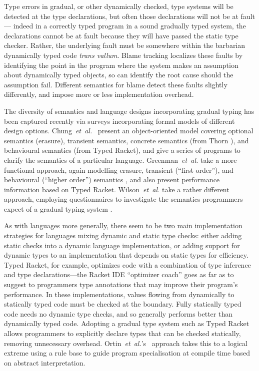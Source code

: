 
Type errors in gradual, or other dynamically checked, type systems will
be detected at the type declarations, but often those
declarations will not be at fault --- indeed in a correctly typed
program in a sound gradually typed system,  the declarations cannot be
at fault because they will have passed the static type
checker. Rather, the underlying fault must be somewhere within the
barbarian dynamically typed code \emph{trans vallum}.
Blame tracking\citep{blame2009,blameThreesomes2010,blameForAll2011} localizes these
faults by identifying 
the point in the program where the system makes an 
assumption about dynamically typed objects, so can identify the root
cause should the assumption fail.  Different semantics for blame
detect these faults slightly differently, and impose more or less
implementation
overhead\citep{reticPython2014,monotonic2015,Vitousek2017}.

The diversity of semantics and language designs incorporating
gradual typing has been captured recently via surveys
incorporating formal models of different design options.
Chung~\textit{et~al.}~\citep{kafka18} present an object-oriented model covering optional
semantics (erasure),  transient semantics, concrete semantics (from Thorn
\cite{Bloom2009}), and behavioural semantics (from Typed Racket), and
give a series of programs to clarify the semantics of a
particular language.  
Greenman~\textit{et~al.} take a more functional approach, again modelling
erasure, transient (``first order''), and behavioural (``higher
order'') semantics \cite{bensurvey18icfp}, and also present
performance information based on Typed Racket.
Wilson~\textit{et~al.} take a rather different approach, employing
questionnaires to investigate the semantics programmers expect of a
gradual typing system  \cite{shriramdls18}.

As with languages more generally, there seem to be two main implementation
strategies for languages mixing dynamic and static type checks: either
adding static checks into a dynamic language implementation, or adding
support for dynamic types to an implementation that depends on
static types for efficiency. Typed Racket, for example, optimizes code with
a combination of type inference and type declarations---the Racket
IDE ``optimizer coach'' goes as far as to suggest to programmers type
annotations that may improve their program's performance\citep{optimizerCoach2012}. In these implementations, values flowing
from dynamically to statically typed code must be checked at the
boundary.  Fully statically typed code needs no dynamic type checks,
and so generally performs better than dynamically typed code. Adopting
a gradual type system such as Typed Racket\citep{typedScheme08} allows
programmers to explicitly declare types that can be checked statically,
removing unnecessary overhead. Ortin~\textit{et~al.}'s~\cite{ORTIN2019} approach takes
this to a logical extreme using a rule base to guide program
specialisation at compile time based on abstract interpretation.

